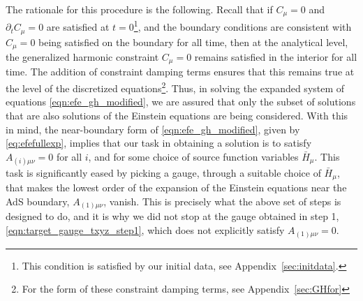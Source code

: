 \documentclass[a4paper,11pt]{article}
\numberwithin{equation}{section}
\begin{document}
The rationale for this procedure is the following.
Recall that if $C_\mu=0$ and $\partial_t C_\mu=0$ are satisfied at $t=0$\footnote{This condition is satisfied by our initial data, see Appendix~\ref{sec:initdata}.}, and the boundary conditions are consistent with $C_\mu=0$ being satisfied on the boundary for all time, then at the analytical level, the generalized harmonic constraint $C_\mu=0$ remains satisfied in the interior for all time. 
The addition of constraint damping terms ensures that this remains true at the level of the discretized equations\footnote{For the form of these constraint damping terms, see Appendix~\ref{sec:GHfor}}.
Thus, in solving the expanded system of equations \eqref{eqn:efe_gh_modified}, we are assured that only the subset of solutions that are also solutions of the Einstein equations are being considered.
With this in mind, the near-boundary form of \eqref{eqn:efe_gh_modified}, given by \eqref{eq:efefullexp}, implies that our task in obtaining a solution is to satisfy $A_{(i)\mu\nu}=0$ for all $i$, and for some choice of source function variables $\bar{H}_\mu$. 
This task is significantly eased by picking a gauge, through a suitable choice of $\bar{H}_\mu$, that makes the lowest order of the expansion of the Einstein equations near the AdS boundary, $A_{(1)\mu\nu}$, vanish.
This is precisely what the above set of steps is designed to do, and it is why we did not stop at the gauge obtained in step 1, \eqref{eqn:target_gauge_txyz_step1}, which does not explicitly satisfy $A_{(1)\mu\nu}=0$. 
\end{document}
